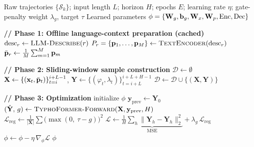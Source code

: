 \begin{algorithm}[t]
\caption{TyphoFormer: Training for Typhoon Track Forecasting}
\label{alg:typhoformer-train}
\begin{algorithmic}[1]
\Require Raw trajectories $\{\mathcal{S}_k\}$; input length $L$; horizon $H$;
         epochs $E$; learning rate $\eta$; gate-penalty weight $\lambda_g$,
         target $\tau$
\Ensure  Learned parameters $\phi = \{\mathbf{W}_g,\mathbf{b}_g,\mathbf{W}_x,\mathbf{W}_p,
         \text{Enc}, \text{Dec}\}$

\Statex \textbf{// Phase 1: Offline language-context preparation (cached)}
  \State $\text{desc}_r \gets \textsc{LLM-Describe}(r)$
  \State $P_r = \{\mathbf{p}_1,\dots,\mathbf{p}_M\} \gets \textsc{TextEncoder}(\text{desc}_r)$
  \State $\bar{\mathbf{p}}_r \gets \frac{1}{M}\sum_{m=1}^{M}\mathbf{p}_m$
\EndFor

\Statex \textbf{// Phase 2: Sliding-window sample construction}
\State $\mathcal{D}\gets\emptyset$
    \State $\mathbf{X}\gets\{(\mathbf{x}_t,\bar{\mathbf{p}}_t)\}_{t=i}^{i+L-1}$,\quad
           $\mathbf{Y}\gets\{(\varphi_t,\lambda_t)\}_{t=i+L}^{i+L+H-1}$
    \State $\mathcal{D}\gets\mathcal{D}\cup\{(\mathbf{X},\mathbf{Y})\}$
  \EndFor
\EndFor

\Statex \textbf{// Phase 3: Optimization}
\State initialize $\phi$
    \State $\mathbf{y}_{\text{prev}} \gets \mathbf{Y}_{0}$
    \State $(\hat{\mathbf{Y}},\, g) \gets
           \textsc{TyphoFormer-Forward}(\mathbf{X}, \mathbf{y}_{\text{prev}}, H)$
    \State $\mathcal{L}_{\text{reg}} \gets
           \frac{1}{|\mathbf{X}|}\sum \big(\max(0,\ \tau - g)\big)^2$
    \State $\mathcal{L} \gets
           \underbrace{\tfrac{1}{H}\!\sum_{h}\!\lVert\hat{\mathbf{Y}}_h-\mathbf{Y}_h\rVert_2^2}_{\text{MSE}}
           + \lambda_g\,\mathcal{L}_{\text{reg}}$
    \State $\phi \gets \phi - \eta\,\nabla_{\phi}\mathcal{L}$
  \EndFor
\EndFor
\State \Return $\phi$
\end{algorithmic}
\end{algorithm}

